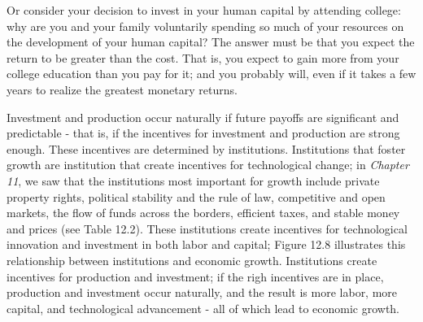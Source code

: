 \documentclass[11pt]{article} %
\begin{document}
Or consider your decision to invest in your human capital by attending college: why are you and your family voluntarily spending so much of your resources on the development of your human capital? The answer must be that you expect the return to be greater than the cost. That is, you expect to gain more from your college education than you pay for it; and you probably will, even if it takes a few years to realize the greatest monetary returns.

Investment and production occur naturally if future payoffs are significant and predictable - that is, if the incentives for investment and production are strong enough. These incentives are determined by institutions. Institutions that foster growth are institution that create incentives for technological change; in \textit{Chapter 11}, we saw that the institutions most important for growth include private property rights, political stability and the rule of law, competitive and open markets, the flow of funds across the borders, efficient taxes, and stable money and prices (see Table 12.2). These institutions create incentives for technological innovation and investment in both labor and capital; Figure 12.8 illustrates this relationship between institutions and economic growth. Institutions create incentives for production and investment; if the righ incentives are in place, production and investment occur naturally, and the result is more labor, more capital, and technological advancement - all of which lead to economic growth.
\end{document}
